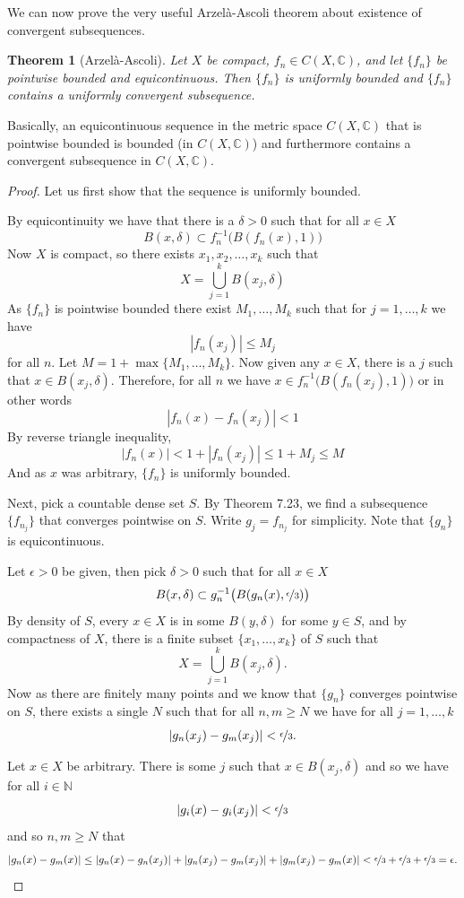 \documentclass[12pt]{book}
\newcommand{\abs}[1]{\left\lvert {#1} \right\rvert}
\newcommand{\C}{{\mathbb{C}}}
\newcommand{\N}{{\mathbb{N}}}
\theoremstyle{plain}
\newtheorem{thm}{Theorem}[section]
\theoremstyle{remark}
\theoremstyle{definition}
\theoremstyle{exercise}
\theoremstyle{example}
\begin{document}
We can now prove the very useful Arzel\`a-Ascoli theorem about existence
of convergent subsequences.

\begin{thm}[Arzel\`a-Ascoli]
Let $X$ be compact, $f_n \in C(X,\C)$, and let $\{ f_n \}$
be pointwise bounded and equicontinuous.  Then
$\{f_n\}$ is uniformly bounded and $\{ f_n \}$ contains a uniformly
convergent subsequence.
\end{thm}

Basically, an equicontinuous sequence in the metric space
$C(X,\C)$ that is pointwise bounded
is bounded (in $C(X,\C)$) and furthermore contains a convergent
subsequence in $C(X,\C)$.

\begin{proof}
Let us first show that the sequence is uniformly bounded.

By equicontinuity we have that there is a $\delta > 0$
such that for all $x \in X$
$$
B(x,\delta) \subset f_n^{-1}\bigl(B(f_n(x),1)\bigr)
$$
Now $X$ is compact, so there exists $x_1,x_2,\ldots,x_k$
such that
$$
X = \bigcup_{j=1}^k B(x_j,\delta)
$$
As $\{ f_n \}$ is pointwise bounded there exist $M_1,\ldots,M_k$
such that for $j=1,\ldots,k$ we have
$$
\abs{f_n(x_j)} \leq M_j
$$
for all $n$.  Let $M = 1+ \max \{ M_1,\ldots,M_k \}$.  Now given any
$x \in X$, there is a $j$ such that $x \in B(x_j,\delta)$.  Therefore,
for all $n$ we have
$x \in f_n^{-1}\bigl(B(f_n(x_j),1)\bigr)$ or in other words
$$
\abs{f_n(x)-f_n(x_j)} < 1
$$
By reverse triangle inequality,
$$
\abs{f_n(x)} < 1+ \abs{f_n(x_j)} \leq 1+M_j \leq M
$$
And as $x$ was arbitrary, $\{f_n\}$ is uniformly bounded.


Next, pick a countable dense set $S$.  By Theorem 7.23, we find
a subsequence $\{ f_{n_j} \}$ that converges pointwise on $S$.
Write $g_j = f_{n_j}$ for simplicity.  Note that $\{ g_n \}$ is 
equicontinuous.

Let $\epsilon > 0$ be given, then pick $\delta > 0$
such that for all $x \in X$
$$
B(x,\delta) \subset g_n^{-1}\bigl(B(g_n(x),\nicefrac{\epsilon}{3})\bigr)
$$
By density of $S$, every $x \in X$ is in some $B(y,\delta)$
for some $y \in S$, and by compactness of $X$,
there is a finite subset $\{ x_1,\ldots,x_k \}$ of $S$
such that
$$
X = \bigcup_{j=1}^k B(x_j,\delta) .
$$
Now as there are finitely many points and we know that $\{ g_n \}$
converges pointwise on $S$, there exists a single $N$ such that for 
all $n,m \geq N$ we have for all $j=1,\ldots,k$
\begin{equation*}
\abs{g_n(x_j)-g_m(x_j)} < \nicefrac{\epsilon}{3} .
\end{equation*}

Let $x \in X$ be arbitrary.  There is some $j$ such that
$x \in B(x_j,\delta)$ and so we have for all $i \in \N$
$$
\abs{g_i(x)-g_i(x_j)} < \nicefrac{\epsilon}{3}
$$
and so $n,m \geq N$ that
$$
\abs{g_n(x)-g_m(x)} \leq
\abs{g_n(x)-g_n(x_j)} +
\abs{g_n(x_j)-g_m(x_j)} +
\abs{g_m(x_j)-g_m(x)} <
\nicefrac{\epsilon}{3} +
\nicefrac{\epsilon}{3} +
\nicefrac{\epsilon}{3} = \epsilon .
$$
\end{proof}
\end{document}

